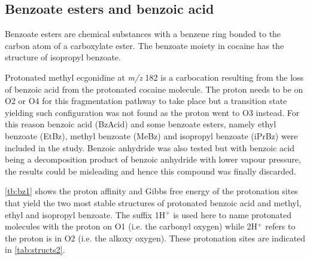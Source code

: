 \subsection{Benzoate esters and benzoic acid}
Benzoate esters are chemical substances with a benzene ring bonded to the carbon atom of a carboxylate ester. 
%
The benzoate moiety in cocaine has the structure of isopropyl benzoate.
%


Protonated methyl ecgonidine at \textit{m/z} 182 is a carbocation resulting from the loss of benzoic acid from the protonated cocaine molecule.
%
The proton needs to be on O2 or O4 for this fragmentation pathway to take place but a transition state yielding such configuration was not found as the proton went to O3 instead. %
For this reason benzoic acid (BzAcid) and some benzoate esters, namely ethyl benzoate (EtBz), methyl benzoate (MeBz) and isopropyl benzoate (iPrBz)  were included in the study.
%
Benzoic anhydride was also tested but with benzoic acid being a decomposition product of benzoic anhydride with lower vapour pressure, the results could be misleading and hence this compound was finally discarded.




 
 \autoref{tb:bz1} shows the proton affinity and Gibbs free energy of the protonation sites that yield the two most stable structures of protonated benzoic acid and methyl, ethyl and isopropyl benzoate.
 The suffix 1H$^+$ is used here to name protonated molecules with the proton on O1 (i.e. the carbonyl oxygen) while  2H$^+$ refers to the proton is in O2 (i.e. the alkoxy oxygen).
 These protonation sites are indicated in \autoref{tab:structs2}. 
%

 
 
 


